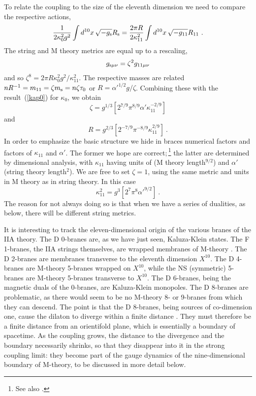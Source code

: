 \documentclass[12pt]{article}
\def\be{\begin{equation}}
\def\ee{\end{equation}}
\def\ap{\alpha'}
\begin{document}
To relate the coupling to the size of the eleventh dimension we need to
compare the respective actions, \cite{wit}
\be
\frac{1}{2\kappa_0^2 g^2} \int d^{10} x\, \sqrt{-g_{\rm s}} R_{\rm s}
= \frac{2\pi R}{2\kappa_{11}^2} \int d^{10} x\, \sqrt{-g_{11}} R_{11}\ .
\ee
The string and M theory metrics are equal up to a rescaling,
\be
g_{{\rm s}\mu\nu} = \zeta^2 g_{{\rm 11}\mu\nu}  \label{mmet}
\ee
and so $\zeta^8 = 2\pi R \kappa_0^2 g^2 / \kappa_{11}^2$.
The respective masses are related $nR^{-1} = m_{11}
= \zeta m_{\rm s} = n \zeta \tau_0$ or
$R = \ap^{1/2} g/\zeta$.  Combining these with the result~(\ref{kap0}) for
$\kappa_0$, we obtain 
\be
\zeta = g^{1/3} \left[2^{7/9} \pi^{8/9} \ap \kappa_{11}^{-2/9}
\right]
\ee
and 
\be
R = g^{2/3} \left[2^{-7/9} \pi^{-8/9} \kappa_{11}^{2/9} \right]\ .  \label{mrad}
\ee
In order to emphasize the basic structure we
hide in braces numerical factors and factors of
$\kappa_{11}$ and $\ap$.  The former we hope are correct;\,\footnote
{See also \cite{shanta}.} the
latter are determined by dimensional analysis, with $\kappa_{11}$ having
units of (M theory length$^{9/2}$) and $\ap$ (string theory length$^2$). 
We are free to set $\zeta = 1$, using the same metric and units in M theory as
in string theory.  In this case
\be
\kappa_{11}^2 = g^3 \left[2^7 \pi^8 \ap^{9/2} \right]\ .
\ee
The reason for not always doing so is that when we have a series of dualities,
as below, there will be different string metrics.

It is interesting to track the eleven-dimensional origin of the various
branes of the IIA theory.  The D 0-branes are, as we have just seen,
Kaluza-Klein states. The F 1-branes, the IIA strings themselves, are
wrapped membranes of M-theory \cite{supmem}.  The D 2-branes are membranes
transverse to the eleventh dimension $X^{10}$.  The D 4-branes are M-theory
5-branes wrapped on $X^{10}$, while the NS (symmetric) 5-branes are
M-theory 5-branes transverse to $X^{10}$.  The D 6-branes, being the
magnetic duals of the 0-branes, are Kaluza-Klein monopoles.  The
D 8-branes are problematic, as there would seem to be no M-theory 8- or
9-branes from which they can descend.  The point is that the D 8-branes,
being sources of co-dimension one, cause the dilaton to diverge within a
finite distance \cite{polwit}.  They must therefore be a finite distance from
an orientifold plane, which is essentially a boundary of spacetime.  As
the coupling grows, the distance to the divergence and the boundary
necessarily shrinks, so that they disappear into it in the strong coupling
limit: they become part of the gauge dynamics of the nine-dimensional
boundary of M-theory, \cite{horwit} to be discussed in more detail below.
\end{document}

